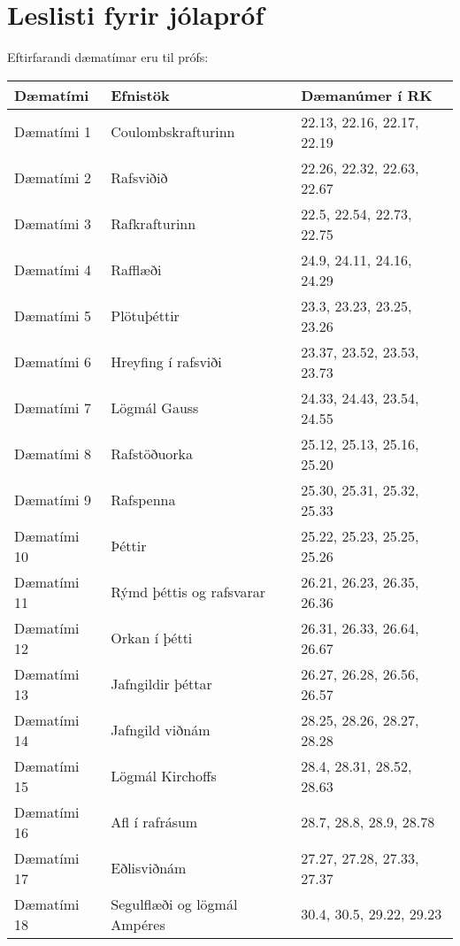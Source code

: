 \newpage

\section*{Leslisti fyrir jólapróf}

Eftirfarandi dæmatímar eru til prófs:

\begin{table}[H]
    \centering
    \begin{tabular}{|l|l|l|}
    \hline
    \textbf{Dæmatími} & \textbf{Efnistök} & \textbf{Dæmanúmer í RK}
     \\ \hline \hline
        Dæmatími 1 & Coulombskrafturinn & 22.13, 22.16, 22.17, 22.19  \\ \hline
        Dæmatími 2 & Rafsviðið & 22.26, 22.32, 22.63, 22.67 \\ \hline
        Dæmatími 3 & Rafkrafturinn & 22.5, 22.54, 22.73, 22.75 \\ \hline
        Dæmatími 4 & Rafflæði & 24.9, 24.11, 24.16, 24.29 \\ \hline
        Dæmatími 5 & Plötuþéttir & 23.3, 23.23, 23.25, 23.26 \\ \hline
        Dæmatími 6 & Hreyfing í rafsviði & 23.37, 23.52, 23.53, 23.73 \\ \hline
        Dæmatími 7 & Lögmál Gauss & 24.33, 24.43, 23.54, 24.55 \\ \hline
        Dæmatími 8 & Rafstöðuorka & 25.12, 25.13, 25.16, 25.20 \\ \hline
        Dæmatími 9 & Rafspenna &  25.30, 25.31, 25.32, 25.33 \\ \hline
        Dæmatími 10 & Þéttir & 25.22, 25.23, 25.25, 25.26 \\ \hline
        Dæmatími 11 & Rýmd þéttis og rafsvarar & 26.21, 26.23, 26.35, 26.36 \\ \hline
        Dæmatími 12 & Orkan í þétti &  26.31, 26.33, 26.64, 26.67 \\ \hline
        Dæmatími 13 & Jafngildir þéttar & 26.27, 26.28, 26.56, 26.57 \\ \hline
        Dæmatími 14 & Jafngild viðnám & 28.25, 28.26, 28.27, 28.28 \\ \hline
        Dæmatími 15 & Lögmál Kirchoffs & 28.4, 28.31, 28.52, 28.63   \\ \hline
        Dæmatími 16 & Afl í rafrásum & 28.7, 28.8, 28.9, 28.78 \\ \hline
        Dæmatími 17 & Eðlisviðnám & 27.27, 27.28, 27.33, 27.37 \\ \hline 
        Dæmatími 18 & Segulflæði og lögmál Ampéres  & 30.4, 30.5, 29.22, 29.23 \\ \hline

\end{tabular}
\end{table}
